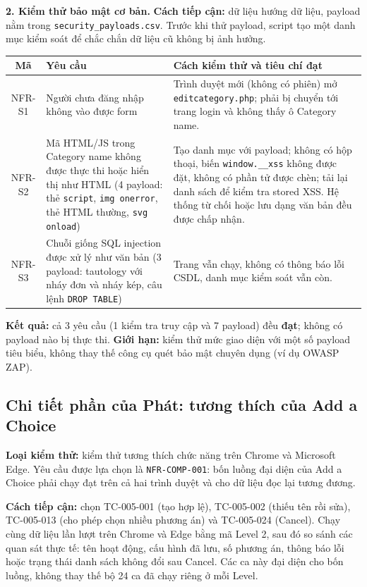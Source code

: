 \documentclass[12pt,a4paper]{article}
\begin{document}
\textbf{2. Kiểm thử bảo mật cơ bản.} \textbf{Cách tiếp cận:} dữ liệu hướng dữ liệu, payload nằm trong \texttt{security\_payloads.csv}. Trước khi thử payload, script tạo một danh mục kiểm soát để chắc chắn dữ liệu cũ không bị ảnh hưởng.
\begin{center}\small
\begin{tabular}{|c|L{4.2cm}|L{6.6cm}|}\hline
{}\textbf{Mã} & \textbf{Yêu cầu} & \textbf{Cách kiểm thử và tiêu chí đạt} \\ \hline
NFR-S1 & Người chưa đăng nhập không vào được form & Trình duyệt mới (không có phiên) mở \texttt{editcategory.php}; phải bị chuyển tới trang login và không thấy ô Category name. \\ \hline
NFR-S2 & Mã HTML/JS trong Category name không được thực thi hoặc hiển thị như HTML (4 payload: thẻ \texttt{script}, \texttt{img onerror}, thẻ HTML thường, \texttt{svg onload}) & Tạo danh mục với payload; không có hộp thoại, biến \texttt{window.\_\_xss} không được đặt, không có phần tử được chèn; tải lại danh sách để kiểm tra stored XSS. Hệ thống từ chối hoặc lưu dạng văn bản đều được chấp nhận. \\ \hline
NFR-S3 & Chuỗi giống SQL injection được xử lý như văn bản (3 payload: tautology với nháy đơn và nháy kép, câu lệnh \texttt{DROP TABLE}) & Trang vẫn chạy, không có thông báo lỗi CSDL, danh mục kiểm soát vẫn còn. \\ \hline
\end{tabular}\end{center}
\textbf{Kết quả:} cả 3 yêu cầu (1 kiểm tra truy cập và 7 payload) đều \textbf{đạt}; không có payload nào bị thực thi. \textbf{Giới hạn:} kiểm thử mức giao diện với một số payload tiêu biểu, không thay thế công cụ quét bảo mật chuyên dụng (ví dụ OWASP ZAP).
\subsection{Chi tiết phần của Phát: tương thích của Add a Choice}
\textbf{Loại kiểm thử:} kiểm thử tương thích chức năng trên Chrome và Microsoft Edge.
Yêu cầu được lựa chọn là \texttt{NFR-COMP-001}: bốn luồng đại diện của Add a Choice phải chạy đạt
trên cả hai trình duyệt và cho dữ liệu đọc lại tương đương.

\textbf{Cách tiếp cận:} chọn TC-005-001 (tạo hợp lệ), TC-005-002 (thiếu tên rồi sửa),
TC-005-013 (cho phép chọn nhiều phương án) và TC-005-024 (Cancel).
Chạy cùng dữ liệu lần lượt trên Chrome và Edge bằng mã Level 2, sau đó so sánh các quan sát thực tế:
tên hoạt động, cấu hình đã lưu, số phương án, thông báo lỗi hoặc trạng thái danh sách không đổi sau Cancel.
Các ca này đại diện cho bốn luồng, không thay thế bộ 24 ca đã chạy riêng ở mỗi Level.
\end{document}
